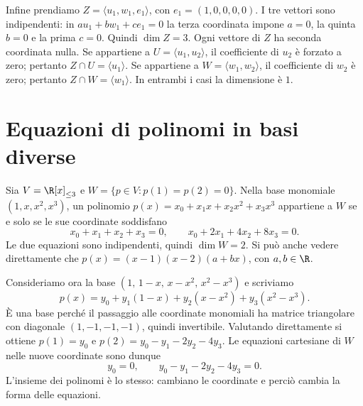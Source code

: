 \begin{esercizio}
Infine prendiamo
$Z=\langle u_1,w_1,e_1\rangle$, con
$e_1=(1,0,0,0,0)$. I tre vettori sono indipendenti:
in $a u_1+b w_1+c e_1=0$ la terza coordinata impone $a=0$,
la quinta $b=0$ e la prima $c=0$. Quindi $\dim Z=3$.
Ogni vettore di $Z$ ha seconda coordinata nulla. Se appartiene
a $U=\langle u_1,u_2\rangle$, il coefficiente di $u_2$ è
forzato a zero; pertanto $Z\cap U=\langle u_1\rangle$.
Se appartiene a $W=\langle w_1,w_2\rangle$, il coefficiente
di $w_2$ è zero; pertanto $Z\cap W=\langle w_1\rangle$.
In entrambi i casi la dimensione è $1$.
\end{esercizio}

\section{Equazioni di polinomi in basi diverse}
\begin{esercizio}
Sia $V=\R[x]_{\leq3}$ e
$W=\{p\in V:p(1)=p(2)=0\}$. Nella base monomiale
$(1,x,x^2,x^3)$, un polinomio
$p(x)=x_0+x_1x+x_2x^2+x_3x^3$ appartiene a $W$ se e
solo se le sue coordinate soddisfano
\[
x_0+x_1+x_2+x_3=0,\qquad
x_0+2x_1+4x_2+8x_3=0.
\]
Le due equazioni sono indipendenti, quindi $\dim W=2$.
Si può anche vedere direttamente che
$p(x)=(x-1)(x-2)(a+bx)$, con $a,b\in\R$.

Consideriamo ora la base
$(1,\,1-x,\,x-x^2,\,x^2-x^3)$ e scriviamo
\[
p(x)=y_0+y_1(1-x)+y_2(x-x^2)+y_3(x^2-x^3).
\]
È una base perché il passaggio alle coordinate monomiali ha
matrice triangolare con diagonale $(1,-1,-1,-1)$, quindi
invertibile. Valutando direttamente si ottiene
$p(1)=y_0$ e $p(2)=y_0-y_1-2y_2-4y_3$. Le equazioni
cartesiane di $W$ nelle nuove coordinate sono dunque
\[
y_0=0,\qquad y_0-y_1-2y_2-4y_3=0.
\]
L'insieme dei polinomi è lo stesso: cambiano le coordinate e
perciò cambia la forma delle equazioni.
\end{esercizio}
